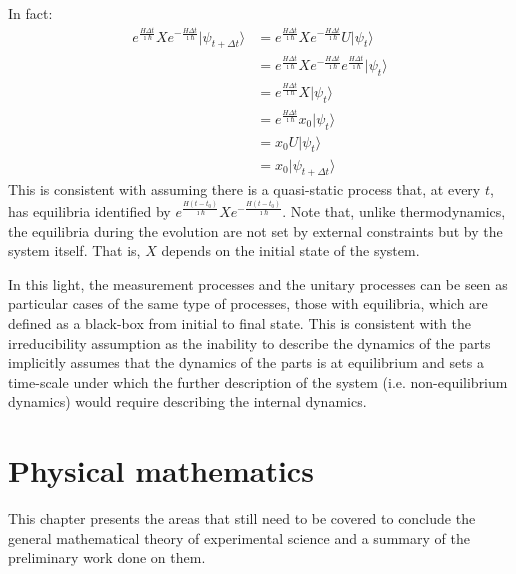 \documentclass[11pt,letterpaper,fleqn]{memoir} %
\begin{document}
In fact:
\begin{equation}
\begin{aligned}
e^{\frac{H\Delta t}{\imath \hbar}} X e^{- \frac{H\Delta t}{\imath \hbar}}| \psi_{t + \Delta t} \rangle
&= e^{\frac{H\Delta t}{\imath \hbar}} X e^{- \frac{H\Delta t}{\imath \hbar}} U | \psi_t \rangle \\
&= e^{\frac{H\Delta t}{\imath \hbar}} X e^{- \frac{H\Delta t}{\imath \hbar}} e^{\frac{H\Delta t}{\imath \hbar}} | \psi_t \rangle \\
&= e^{\frac{H\Delta t}{\imath \hbar}} X  | \psi_t \rangle \\
&= e^{\frac{H\Delta t}{\imath \hbar}} x_0  | \psi_t \rangle \\
&= x_0 U | \psi_t \rangle \\
&= x_0 | \psi_{t + \Delta t} \rangle
\end{aligned}
\end{equation}
This is consistent with assuming there is a quasi-static process that, at every $t$, has equilibria identified by $e^{\frac{H (t - t_0)}{\imath \hbar}} X e^{- \frac{H (t - t_0)}{\imath \hbar}}$. Note that, unlike thermodynamics, the equilibria during the evolution are not set by external constraints but by the system itself. That is, $X$ depends on the initial state of the system.

In this light, the measurement processes and the unitary processes can be seen as particular cases of the same type of processes, those with equilibria, which are defined as a black-box from initial to final state. This is consistent with the irreducibility assumption as the inability to describe the dynamics of the parts implicitly assumes that the dynamics of the parts is at equilibrium and sets a time-scale under which the further description of the system (i.e. non-equilibrium dynamics) would require describing the internal dynamics.


\def\eqgran{\doteq}
\def\finer{\leqdot}
\def\nfiner{\nleqdot}
\def\coarser{\geqdot}
\def\ncoarser{\ngeqdot}
\def\sfiner{\lessdot}
\def\scoarser{\gtrdot}

\chapter{Physical mathematics}

This chapter presents the areas that still need to be covered to conclude the general mathematical theory of experimental science and a summary of the preliminary work done on them.
\end{document}
